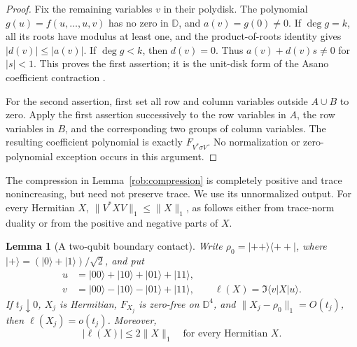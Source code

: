 \documentclass[reqno]{amsart}
\newtheorem{lemma}[theorem]{Lemma}
\theoremstyle{definition}
\theoremstyle{remark}
\newcommand{\D}{\mathbb D}
\begin{document}
\begin{proof}
Fix the remaining variables $v$ in their polydisk.  The polynomial
$g(u)=f(u,\ldots,u,v)$ has no zero in $\D$, and $a(v)=g(0)\ne0$.
If $\deg g=k$, all its roots have modulus at least one, and the
product-of-roots identity gives $|d(v)|\leq|a(v)|$.
If $\deg g<k$, then $d(v)=0$.  Thus $a(v)+d(v)s\ne0$ for $|s|<1$.
This proves the first assertion; it is the unit-disk form of the
Asano coefficient contraction \cite{AsanoJapanese70}.

For the second assertion, first set all row and column variables
outside $A\cup B$ to zero.  Apply the first assertion successively to
the row variables in $A$, the row variables in $B$, and the corresponding
two groups of column variables.  The resulting coefficient polynomial
is exactly $F_{V^*\sigma V}$.  No normalization or zero-polynomial
exception occurs in this argument.
\end{proof}

The compression in Lemma~\ref{rob:compression} is completely positive
and trace nonincreasing, but need not preserve trace.  We use its
unnormalized output.  For every Hermitian $X$,
$\|V^*XV\|_1\leq\|X\|_1$, as follows either from trace-norm duality
or from the positive and negative parts of $X$.

\begin{lemma}[A two-qubit boundary contact]
\label{rob:contact}
Write $\rho_0=|++\rangle\langle++|$, where
$|+\rangle=(|0\rangle+|1\rangle)/\sqrt2$, and put
\begin{align*}
 u&=|00\rangle+|10\rangle+|01\rangle+|11\rangle,\\
 v&=|00\rangle-|10\rangle-|01\rangle+|11\rangle,\qquad
 \ell(X)=\Im\langle v|X|u\rangle.
\end{align*}
If $t_j\downarrow0$, $X_j$ is Hermitian, $F_{X_j}$ is zero-free on
$\D^4$, and $\|X_j-\rho_0\|_1=O(t_j)$, then
$\ell(X_j)=o(t_j)$.  Moreover,
\begin{equation}
 |\ell(X)|\leq2\|X\|_1
 \quad\text{for every Hermitian }X.
 \label{rob:functional-norm}
\end{equation}
\end{lemma}
\end{document}
